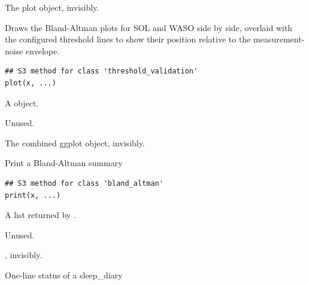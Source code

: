 \documentclass[a4paper]{book}
\begin{document}
%
\begin{Value}
The plot object, invisibly.
\end{Value}
%
\begin{Description}
Draws the Bland-Altman plots for SOL and WASO side by side, overlaid
with the configured threshold lines to show their position relative to
the measurement-noise envelope.
\end{Description}
%
\begin{Usage}
\begin{verbatim}
## S3 method for class 'threshold_validation'
plot(x, ...)
\end{verbatim}
\end{Usage}
%
\begin{Arguments}
\begin{ldescription}
\item[\code{x}] A  object.

\item[\code{...}] Unused.
\end{ldescription}
\end{Arguments}
%
\begin{Value}
The combined ggplot object, invisibly.
\end{Value}
%
\begin{Description}
Print a Bland-Altman summary
\end{Description}
%
\begin{Usage}
\begin{verbatim}
## S3 method for class 'bland_altman'
print(x, ...)
\end{verbatim}
\end{Usage}
%
\begin{Arguments}
\begin{ldescription}
\item[\code{x}] A list returned by .

\item[\code{...}] Unused.
\end{ldescription}
\end{Arguments}
%
\begin{Value}
, invisibly.
\end{Value}
%
\begin{Description}
One-line status of a sleep\_diary
\end{Description}
\end{document}
